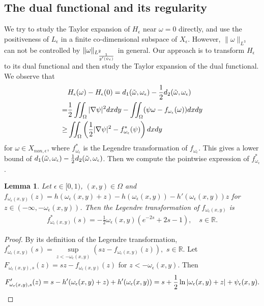 \documentclass[1 [leqno, 11pt]{amsart}
\numberwithin{equation}{section}
\let\ep=\epsilon
\newtheorem{lemma}[Theorem]{Lemma}
\begin{document}
\begin{CJK*}{GBK}{song}
\subsection{The dual functional and its regularity}
We   try to study the Taylor expansion of $H_\ep$ near $\omega=0$ directly, and use the positiveness of  $L_\ep$ in a finite co-dimensional subspace of $X_\ep$. However,
 $\|\omega\|_{L^3}$ can not be controlled by $\|\omega\|_{L_{1\over g'(\psi_\ep)}^2}$ in general. Our approach is  to transform $H_\ep$ to its dual functional and then study the Taylor expansion of the dual functional.
We observe that
\begin{align}\nonumber&H_\ep(\omega) - H_\ep(0)
 = d_{1}(\tilde\omega,\omega_\ep)-{1\over2}d_2(\tilde\omega,\omega_\ep)\\\nonumber
 =&{1\over2}\iint_{\Omega}|\nabla\psi|^2dxdy-\iint_{\Omega}(\psi\omega-f_{\omega_\ep}(\omega))dxdy\\\label{H-omega-H-0}
 \geq &  \iint_{\Omega} \left(\frac 1 2 |\nabla \psi|^2 - f_{\omega_\ep}^*(\psi)\right) dxdy
 \end{align}
 for $\omega \in X_{non,\ep}$, where $f_{\omega_\ep}^*$ is the Legendre transformation of $f_{\omega_\ep}$.
This gives  a lower bound of $d_{1}(\tilde\omega,\omega_\ep)-{1\over2}d_2(\tilde\omega,\omega_\ep)$. Then  we compute the pointwise expression of  $f_{\omega_\ep}^*$.
\begin{lemma}\label{Legendre transformation}
Let $\ep\in[0,1)$, $(x,y)\in\Omega$ and  $f_{\omega_\ep(x,y)}(z)= h(\omega_\ep(x,y) + z ) - h(\omega_\ep(x,y))  -  h'(\omega_\ep(x,y))z $ for  $z\in(-\infty,-\omega_\ep(x,y))$.
Then
 the Legendre transformation of $f_{\omega_\ep(x,y)}$ is
\begin{align*}
f_{\omega_\ep(x,y)}^*(s)= - \frac 1 2 \omega_\ep(x,y) (e^{-2s} + 2s - 1),\quad s\in\mathbb{R}.
\end{align*}
\end{lemma}
\begin{proof}
By its definition of  the Legendre transformation, $f_{\omega_\ep(x,y)}^*(s)=\sup\limits_{z<-\omega_\ep(x,y)}(sz-f_{\omega_\ep(x,y)}(z)),$ $ s\in\mathbb{R}$.
Let $F_{\omega_\ep(x,y),s}(z)=sz-f_{\omega_\ep(x,y)}(z)$ for $z<-\omega_\ep(x,y)$. Then
\begin{align*}
F_{\omega_\ep(x,y),s}'(z)= s - h'(\omega_\ep(x,y) +z) +h'(\omega_\ep(x,y)) =s+{1\over2}\ln|\omega_\ep(x,y)+z|+\psi_\ep(x,y).
\end{align*}

\end{proof}
\end{CJK*}
\end{document}
